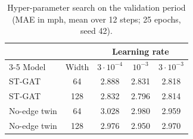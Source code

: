 \begin{table}[t]
\centering
\caption{Hyper-parameter search on the validation period (MAE in mph, mean over 12 steps; 25 epochs, seed 42).}
\label{tab:search}
\setlength{\tabcolsep}{5pt}
\begin{tabular}{@{}lcccc@{}}
\toprule
 & & \multicolumn{3}{c}{Learning rate} \\
\cmidrule(l){3-5}
Model & Width & $3\cdot10^{-4}$ & $10^{-3}$ & $3\cdot10^{-3}$ \\
\midrule
ST-GAT & 64 & 2.888 & 2.831 & 2.818 \\
ST-GAT & 128 & 2.832 & 2.796 & 2.814 \\
No-edge twin & 64 & 3.028 & 2.980 & 2.959 \\
No-edge twin & 128 & 2.976 & 2.950 & 2.970 \\
\bottomrule
\end{tabular}
\end{table}
